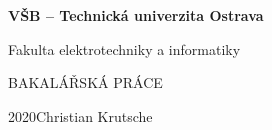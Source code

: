 \documentclass[11pt]{article}
\newcommand{\BookCover}[6]
{
	\begin{center}
		\Huge\bfseries
		#1\par\medskip
		#2\par
		\vspace{#3}
		#4\par
	\end{center}
	\vfill
	{\Huge#5\hfill#6}
	\clearpage
}
\begin{document}
\BookCover{VŠB -- Technická univerzita Ostrava}{Fakulta elektrotechniky a informatiky}{96mm}{BAKALÁŘSKÁ PRÁCE}{2020}{Christian Krutsche}
\end{document}

